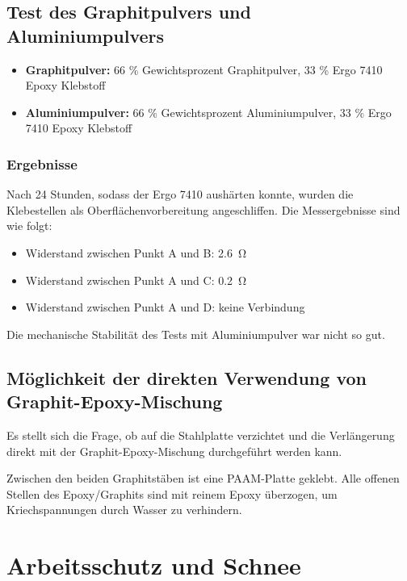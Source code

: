 \subsection{Test des Graphitpulvers und Aluminiumpulvers}

\begin{itemize}
    \item \textbf{Graphitpulver:} 66 \% Gewichtsprozent Graphitpulver, 33 \% Ergo 7410 Epoxy Klebstoff
    \item \textbf{Aluminiumpulver:} 66 \% Gewichtsprozent Aluminiumpulver, 33 \% Ergo 7410 Epoxy Klebstoff
\end{itemize}

\subsubsection{Ergebnisse}

Nach 24 Stunden, sodass der Ergo 7410 aushärten konnte, wurden die Klebestellen als Oberflächenvorbereitung angeschliffen. Die Messergebnisse sind wie folgt:

\begin{itemize}
    \item Widerstand zwischen Punkt A und B: \SI{2.6}{\ohm}
    \item Widerstand zwischen Punkt A und C: \SI{0.2}{\ohm}
    \item Widerstand zwischen Punkt A und D: keine Verbindung
\end{itemize}

Die mechanische Stabilität des Tests mit Aluminiumpulver war nicht so gut.

\subsection{Möglichkeit der direkten Verwendung von Graphit-Epoxy-Mischung}

Es stellt sich die Frage, ob auf die Stahlplatte verzichtet und die Verlängerung direkt mit der Graphit-Epoxy-Mischung durchgeführt werden kann.

Zwischen den beiden Graphitstäben ist eine PAAM-Platte geklebt. Alle offenen Stellen des Epoxy/Graphits sind mit reinem Epoxy überzogen, um Kriechspannungen durch Wasser zu verhindern.

\section{Arbeitsschutz und Schnee}

